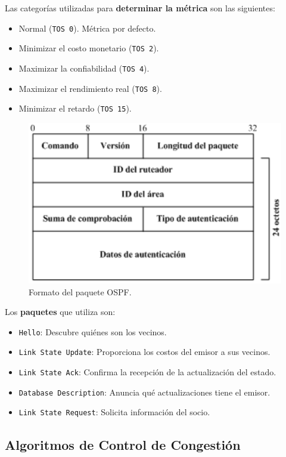 \documentclass[10pt,a4paper]{article}
\begin{document}
Las categorías utilizadas para \textbf{determinar la métrica} son las siguientes:
\begin{multicols}{2}
\begin{itemize}
\item Normal (\texttt{TOS 0}). Métrica por defecto.
\item  Minimizar el costo monetario (\texttt{TOS 2}).
\item  Maximizar la confiabilidad (\texttt{TOS 4}).
\item  Maximizar el rendimiento real (\texttt{TOS 8}).
\item Minimizar el retardo (\texttt{TOS 15}).
\end{itemize}
\end{multicols}

\begin{figure}
  \caption{Formato del paquete OSPF.}
  \label{fig:ospf_protocol}
  \centering
  \hbox{\includegraphics[width=0.5\textwidth-\fboxrule-\fboxrule]{imgs/ospf_protocol.png}}
\end{figure}

Los \textbf{paquetes} que utiliza son:

\begin{itemize}
\item \texttt{Hello}: Descubre quiénes son los vecinos.
\item \texttt{Link State Update}: Proporciona los costos del emisor a sus vecinos.
\item \texttt{Link State Ack}: Confirma la recepción de la actualización del estado.
\item \texttt{Database Description}: Anuncia qué actualizaciones tiene el emisor.
\item \texttt{Link State Request}: Solicita información del socio.
\end{itemize}

\subsection{Algoritmos de Control de Congestión}
\end{document}
